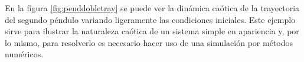 \documentclass[letterpaper,11pt]{article}
\begin{document}
En la figura \ref{fig:penddobletray} se puede ver la dinámica caótica de la trayectoria del segundo péndulo variando ligeramente las condiciones iniciales. Este ejemplo sirve para ilustrar la naturaleza caótica de un sistema simple en apariencia y, por lo mismo, para resolverlo es necesario hacer uso de una simulación por métodos numéricos.
\end{document}
